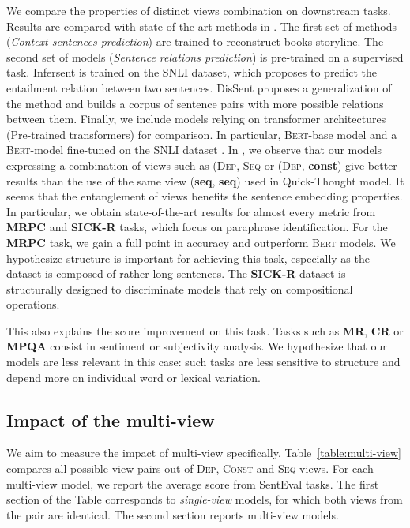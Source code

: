 We compare the properties of distinct views combination on downstream tasks. Results are compared with state of the art methods in . The first set of methods (\textsl{Context sentences prediction}) are trained to reconstruct books storyline. %
The second set of models (\textsl{Sentence relations prediction}) is pre-trained on a supervised task. Infersent \parencite{conneau_17} is trained on the SNLI dataset, which proposes to predict the entailment relation between two sentences. DisSent \parencite{nie_19} proposes a generalization of the method and builds a corpus of sentence pairs with more possible relations between them. Finally, we include models relying on transformer architectures (Pre-trained transformers) for comparison. In particular, \textsc{Bert}-base model and a \textsc{Bert}-model fine-tuned on the SNLI dataset \cite{reimers_19}. 
In , we observe that our models expressing a combination of views such as (\textsc{Dep}, \textsc{Seq} or (\textsc{Dep}, \textbf{const}) give better results than the use of the same view (\textbf{seq}, \textbf{seq}) used in Quick-Thought model. It seems that the entanglement of views benefits the sentence embedding properties. In particular, we obtain state-of-the-art results for almost every metric from \textbf{MRPC} and \textbf{SICK-R} tasks, which focus on paraphrase identification. For the \textbf{MRPC} task, we gain a full point in accuracy and outperform \textsc{Bert} models. We hypothesize structure is important for achieving this task, especially as the dataset is composed of rather long sentences. The \textbf{SICK-R} dataset is structurally designed to discriminate models that rely on compositional operations. 

This also explains the score improvement on this task. Tasks such as \textbf{MR}, \textbf{CR} or \textbf{MPQA} consist in sentiment or subjectivity analysis. We hypothesize that our models are less relevant in this case: such tasks are less sensitive to structure and depend more on individual word or lexical variation.

\subsection{Impact of the multi-view}

We aim to measure the impact of multi-view specifically. Table~\ref{table:multi-view} compares all possible view pairs out of \textsc{Dep}, \textsc{Const} and \textsc{Seq} views. For each multi-view model, we report the average score from SentEval tasks. The first section of the Table corresponds to \textit{single-view} models, for which both views from the pair are identical. The second section reports multi-view models. 

